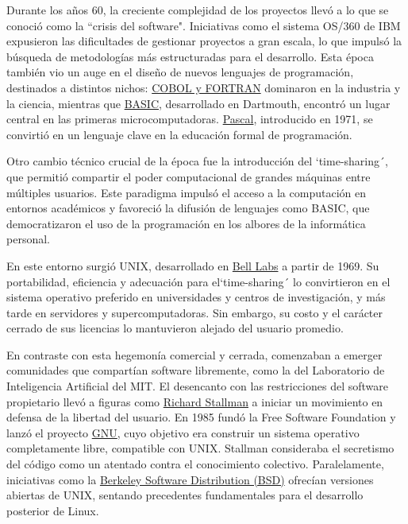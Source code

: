 \documentclass[a4paper,12pt]{article}
\begin{document}
Durante los años 60, la creciente complejidad de los proyectos llevó a lo que se
conoció como la ``crisis del software". Iniciativas como el sistema OS/360 de IBM
expusieron las dificultades de gestionar proyectos a gran escala, lo que impulsó
la búsqueda de metodologías más estructuradas para el desarrollo. Esta época
también vio un auge en el diseño de nuevos lenguajes de programación, destinados
a distintos nichos: \hyperlink{cobolfortran}{COBOL y FORTRAN} dominaron en la
industria y la ciencia, mientras que \hyperlink{basic}{BASIC}, desarrollado en
Dartmouth, encontró un lugar central en las primeras microcomputadoras.
\hyperlink{pascal}{Pascal}, introducido en 1971, se convirtió en un lenguaje
clave en la educación formal de programación.

Otro cambio técnico crucial de la época fue la introducción del `time-sharing´,
que permitió compartir el poder computacional de grandes máquinas entre
múltiples usuarios. Este paradigma impulsó el acceso a la computación en
entornos académicos y favoreció la difusión de lenguajes como BASIC, que
democratizaron el uso de la programación en los albores de la informática
personal.

En este entorno surgió UNIX, desarrollado en \hyperlink{belllabs}{Bell Labs} a partir de 1969. Su
portabilidad, eficiencia y adecuación para el`time-sharing´ lo convirtieron en el
sistema operativo preferido en universidades y centros de investigación, y más
tarde en servidores y supercomputadoras. Sin embargo, su costo y el carácter
cerrado de sus licencias lo mantuvieron alejado del usuario promedio.

En contraste con esta hegemonía comercial y cerrada, comenzaban a emerger
comunidades que compartían software libremente, como la del Laboratorio de
Inteligencia Artificial del MIT. El desencanto con las restricciones del
software propietario llevó a figuras como \hyperlink{stallman}{Richard Stallman} a iniciar un
movimiento en defensa de la libertad del usuario. En 1985 fundó la Free Software
Foundation y lanzó el proyecto \hyperlink{gnu}{GNU}, cuyo objetivo era construir un sistema
operativo completamente libre, compatible con UNIX. Stallman consideraba el
secretismo del código como un atentado contra el conocimiento colectivo.
Paralelamente, iniciativas como la \hyperlink{bsd}{Berkeley Software Distribution (BSD)} ofrecían
versiones abiertas de UNIX, sentando precedentes fundamentales para el
desarrollo posterior de Linux.
\end{document}
